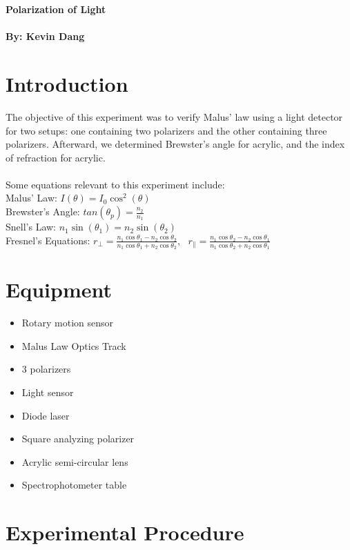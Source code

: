 \documentclass[a4paper, 11pt]{article}
\begin{document}
\noindent
\LARGE \textbf{Polarization of Light} \\
\\
\normalsize \textbf{By: Kevin Dang}



\section*{Introduction}

The objective of this experiment was to verify Malus’ law using a light detector for two setups: one containing two polarizers and the other containing three polarizers. Afterward, we determined Brewster’s angle for acrylic, and the index of refraction for acrylic. \\
\\
Some equations relevant to this experiment include: \\

Malus' Law: $I(\theta) = I_{0}\cos^{2}(\theta)$ \\

Brewster's Angle: $tan(\theta_p) = \frac{n_2}{n_1}$ \\

Snell's Law: $n_1\sin(\theta_1) = n_2\sin(\theta_2)$ \\

Fresnel's Equations: $r_{\perp}=\frac{n_1\cos\theta_1-n_2\cos\theta_2}{n_1\cos\theta_1+n_2\cos\theta_2} , \ \ \ r_{\parallel}=\frac{n_1\cos\theta_2-n_2\cos\theta_1}{n_1\cos\theta_2+n_2\cos\theta_1}$


\section*{Equipment}

\begin{itemize}
\item Rotary motion sensor
\item Malus Law Optics Track
\item 3 polarizers
\item Light sensor
\item Diode laser
\item Square analyzing polarizer
\item Acrylic semi-circular lens
\item Spectrophotometer table
\end{itemize}


\section*{Experimental Procedure}
\end{document}
